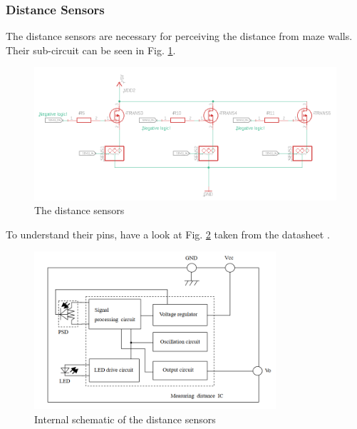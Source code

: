 \FloatBarrier
\vspace{1cm}


\subsubsection{Distance Sensors}

The distance sensors are necessary for perceiving the distance from maze walls. Their sub-circuit can be seen in Fig. \ref{fig:sensors}.

\begin{figure}[htb]
    \centering
    \includegraphics[width=1\textwidth]{figures/hardware/DistanceSensors.PNG}
    \caption{The distance sensors}
    \label{fig:sensors}
\end{figure}

\FloatBarrier

To understand their pins, have a look at Fig. \ref{fig:sensorsData} taken from the datasheet \cite{sens}.

\begin{figure}[htb]
    \centering
    \includegraphics[width=0.8\textwidth]{figures/hardware/sensorData.PNG}
    \caption{Internal schematic of the distance sensors}
    \label{fig:sensorsData}
\end{figure}
\FloatBarrier

